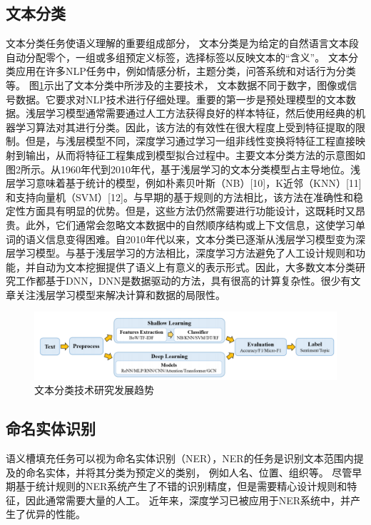 \subsection{文本分类}
文本分类任务使语义理解的重要组成部分，
文本分类是为给定的自然语言文本段自动分配零个，一组或多组预定义标签，选择标签以反映文本的“含义”。
文本分类应用在许多NLP任务中，例如情感分析，主题分类，问答系统和对话行为分类等。
图\ref{fig:textClassification}示出了文本分类中所涉及的主要技术，
文本数据不同于数字，图像或信号数据。它要求对NLP技术进行仔细处理。重要的第一步是预处理模型的文本数据。浅层学习模型通常需要通过人工方法获得良好的样本特征，然后使用经典的机器学习算法对其进行分类。因此，该方法的有效性在很大程度上受到特征提取的限制。但是，与浅层模型不同，深度学习通过学习一组非线性变换将特征工程直接映射到输出，从而将特征工程集成到模型拟合过程中。主要文本分类方法的示意图如图2所示。从1960年代到2010年代，基于浅层学习的文本分类模型占主导地位。浅层学习意味着基于统计的模型，例如朴素贝叶斯（NB）[10]，K近邻（KNN）[11]和支持向量机（SVM）[12]。与早期的基于规则的方法相比，该方法在准确性和稳定性方面具有明显的优势。但是，这些方法仍然需要进行功能设计，这既耗时又昂贵。此外，它们通常会忽略文本数据中的自然顺序结构或上下文信息，这使学习单词的语义信息变得困难。自2010年代以来，文本分类已逐渐从浅层学习模型变为深层学习模型。与基于浅层学习的方法相比，深度学习方法避免了人工设计规则和功能，并自动为文本挖掘提供了语义上有意义的表示形式。因此，大多数文本分类研究工作都基于DNN，DNN是数据驱动的方法，具有很高的计算复杂性。很少有文章关注浅层学习模型来解决计算和数据的局限性。
\begin{figure}[htbp]
  \centering
  \includegraphics[scale=1]{./images/textClassification.png}
  \caption{文本分类技术研究发展趋势\cite{li2020survey}}
  \label{fig:textClassification}
\end{figure}


\subsection{命名实体识别}
语义槽填充任务可以视为命名实体识别（NER），NER的任务是识别文本范围内提及的命名实体，并将其分类为预定义的类别，
例如人名、位置、组织等。
尽管早期基于统计规则的NER系统产生了不错的识别精度，但是需要精心设计规则和特征，因此通常需要大量的人工。
近年来，深度学习已被应用于NER系统中，并产生了优异的性能。

